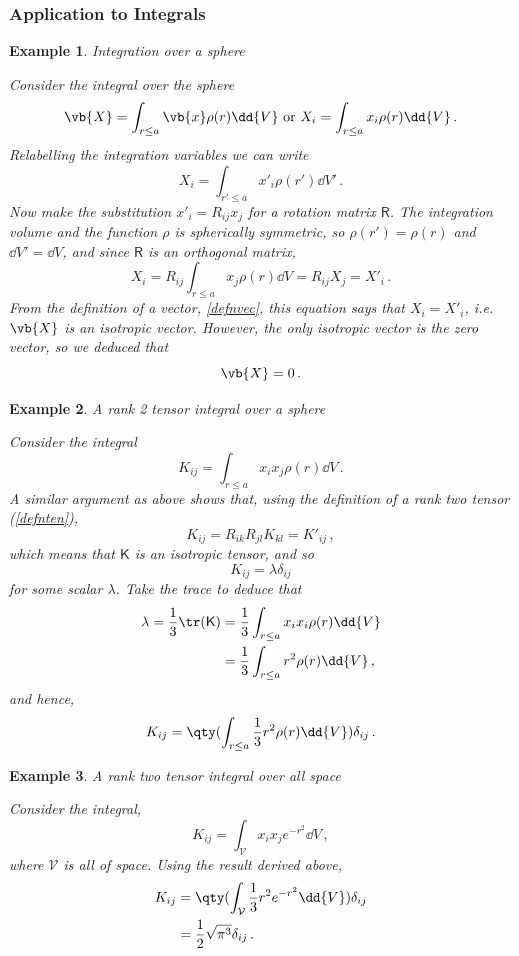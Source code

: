 \documentclass{article}
\theoremstyle{plain}\theoremheaderfont{\normalfont\itshape}\theorembodyfont{\rmfamily}\theoremseparator{.}\newtheorem*{rem}{Remark}\newtheorem*{ex}{Example}\newtheorem*{proof}{Proof}\newtheorem*{altp}{Alternative proof}
\theoremstyle{plain}\theoremheaderfont{\normalfont\bfseries}\theorembodyfont{\rmfamily}\theoremseparator{.}\newtheorem{thm}{Theorem}[section]\newtheorem{lem}[thm]{Lemma}\newtheorem{prop}[thm]{Proposition}\newtheorem*{cor}{Corollary}\newtheorem{defn}[thm]{Definition}\newtheorem{clm}[thm]{Claim}\newtheorem{clminproof}{Claim}
\theoremstyle{break}\theoremheaderfont{\normalfont\itshape}\theorembodyfont{\rmfamily}\theoremseparator{.\medskip}\newtheorem*{proofskip}{Proof}\newtheorem*{exs}{Examples}\newtheorem*{rems}{Remarks}
\theoremstyle{break}\theoremheaderfont{\normalfont\bfseries}\theorembodyfont{\rmfamily}\theoremseparator{.\medskip}\newtheorem{lemskip}[thm]{Lemma}\newtheorem{defnskip}[thm]{Definition}\newtheorem{propskip}[thm]{Proposition}\newtheorem{thmskip}[thm]{Theorem}
\numberwithin{equation}{section}
\begin{document}
	\subsubsection{Application to Integrals}
	\begin{ex}
		\textit{Integration over a sphere}

		Consider the integral over the sphere
		\[\vb{X}=\int_{r\le a}\vb{x}\rho(r)\dd{V}\text{ or }X_i=\int_{r\le a}x_i\rho(r)\dd{V}\,.\]
		Relabelling the integration variables we can write
		\[X_i=\int_{r'\le a}x'_i\rho(r')\dd{V'}\,.\]
		Now make the substitution \(x'_i=R_{ij}x_j\) for a rotation matrix \(\mathsf{R}\). The integration volume and the function \(\rho\) is spherically symmetric, so \(\rho(r')=\rho(r)\) and \(\dd{V'}=\dd{V}\), and since \(\mathsf{R}\) is an orthogonal matrix,
		\[X_i=R_{ij}\int_{r\le a}x_j\rho(r)\dd{V}=R_{ij}X_j=X'_i\,.\]
		From the definition of a vector, \cref{defnvec}, this equation says that \(X_i=X'_i\), i.e. \(\vb{X}\) is an isotropic vector. However, the only isotropic vector is the zero vector, so we deduced that
		\[\vb{X}=0\,.\]
	\end{ex}
	\begin{ex}
		\textit{A rank 2 tensor integral over a sphere}

		Consider the integral
		\[K_{ij}=\int_{r\le a}x_ix_j\rho(r)\dd{V}\,.\]
		A similar argument as above shows that, using the definition of a rank two tensor (\cref{defnten}),
		\[K_{ij}=R_{ik}R_{jl}K_{kl}=K'_{ij}\,,\]
		which means that \(\mathsf{K}\) is an isotropic tensor, and so
		\[K_{ij}=\lambda\delta_{ij}\]
		for some scalar \(\lambda\). Take the trace to deduce that
		\begin{align*}
			\lambda=\frac{1}{3}\tr(\mathsf{K})&=\frac{1}{3}\int_{r\le a}x_ix_i\rho(r)\dd{V}\\
			&=\frac{1}{3}\int_{r\le a}r^2\rho(r)\dd{V}\,,
		\end{align*}
		and hence,
		\[K_{ij}=\qty(\int_{r\le a}\frac{1}{3}r^2\rho(r)\dd{V})\delta_{ij}\,.\]		
	\end{ex}
	\begin{ex}
		\textit{A rank two tensor integral over all space}

		Consider the integral,
		\[K_{ij}=\int_\mathcal{V}x_ix_je^{-r^2}\dd{V}\,,\]
		where \(\mathcal{V}\) is all of space. Using the result derived above,
		\begin{align*}
			K_{ij}&=\qty(\int_\mathcal{V}\frac{1}{3}r^2e^{-r^2}\dd{V})\delta_{ij}\\
			&=\frac{1}{2}\sqrt{\pi^3}\delta_{ij}\,.
		\end{align*}
	\end{ex}
\end{document}
